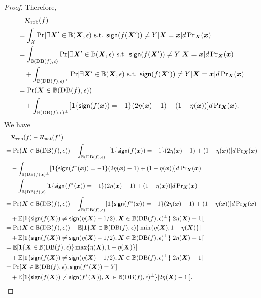 \documentclass[11pt]{article}
\newcommand{\sign}{\textup{\textsf{sign}}}
\newcommand{\adv}{\mathrm{rob}}
\newcommand{\nat}{\mathrm{nat}}
\newcommand{\boundary}{\mathrm{DB}}
\newcommand{\x}{\bm{x}}
\newcommand{\X}{\bm{X}}
\newcommand{\0}{\mathbf{0}}
\newcommand{\1}{\mathbf{1}}
\newcommand{\cR}{\mathcal{R}}
\newcommand{\cX}{\mathcal{X}}
\newcommand{\bbB}{\mathbb{B}}
\newcommand{\bbE}{\mathbb{E}}
\begin{document}
\begin{proof}
Therefore,
\begin{equation*}
\begin{split}
&\quad \cR_\adv(f)\\
&=\int_{\cX} \Pr[\exists \X'\in\bbB(\X,\epsilon) \text{ s.t. }\sign(f(\X'))\not=Y|\X=\x] d \Pr\nolimits_{\X}(\x)\\
&=\int_{\bbB(\boundary(f),\epsilon)} \Pr[\exists \X'\in\bbB(\X,\epsilon) \text{ s.t. }\sign(f(\X'))\not=Y|\X=\x] d \Pr\nolimits_{\X}(\x)\\
&\quad +\int_{\bbB(\boundary(f),\epsilon)^\perp} \Pr[\exists \X'\in\bbB(\X,\epsilon) \text{ s.t. }\sign(f(\X'))\not=Y|\X=\x] d \Pr\nolimits_{\X}(\x)\\
&=\Pr(\X\in \bbB(\boundary(f),\epsilon))\\
&\quad +\int_{\bbB(\boundary(f),\epsilon)^\perp} [\1\{\sign(f(\x))=-1\}(2\eta(\x)-1)+(1-\eta(\x))]d \Pr\nolimits_{\X}(\x).
\end{split}
\end{equation*}
We have
\begin{equation*}
\begin{split}
&\quad\cR_\adv(f)-\cR_\nat(f^*)\\
&=\Pr(\X\in \bbB(\boundary(f),\epsilon))+\int_{\bbB(\boundary(f),\epsilon)^\perp} [\1\{\sign(f(\x))=-1\}(2\eta(\x)-1)+(1-\eta(\x))]d \Pr\nolimits_{\X}(\x)\\
&\quad-\int_{\bbB(\boundary(f),\epsilon)^\perp} [\1\{\sign(f^*(\x))=-1\}(2\eta(\x)-1)+(1-\eta(\x))]d \Pr\nolimits_{\X}(\x)\\
&\quad-\int_{\bbB(\boundary(f),\epsilon)} [\1\{\sign(f^*(\x))=-1\}(2\eta(\x)-1)+(1-\eta(\x))]d \Pr\nolimits_{\X}(\x)\\
&=\Pr(\X\in \bbB(\boundary(f),\epsilon))-\int_{\bbB(\boundary(f),\epsilon)} [\1\{\sign(f^*(\x))=-1\}(2\eta(\x)-1)+(1-\eta(\x))]d \Pr\nolimits_{\X}(\x)\\
&\quad+\bbE[\1\{\sign(f(\X))\not=\sign(\eta(\X)-1/2),\X\in\bbB(\boundary(f),\epsilon)^\perp\}|2\eta(\X)-1|]\\
&=\Pr(\X\in \bbB(\boundary(f),\epsilon))-\bbE[\1\{\X\in \bbB(\boundary(f),\epsilon)\}\min\{\eta(\X),1-\eta(\X)\}]\\
&\quad+\bbE[\1\{\sign(f(\X))\not=\sign(\eta(\X)-1/2),\X\in\bbB(\boundary(f),\epsilon)^\perp\}|2\eta(\X)-1|]\\
&=\bbE[\1\{\X\in \bbB(\boundary(f),\epsilon)\}\max\{\eta(\X),1-\eta(\X)\}]\\
&\quad +\bbE[\1\{\sign(f(\X))\not=\sign(\eta(\X)-1/2),\X\in\bbB(\boundary(f),\epsilon)^\perp\}|2\eta(\X)-1|]\\
&=\Pr[\X\in \bbB(\boundary(f),\epsilon),\sign(f^*(\X))=Y]\\
&\quad +\bbE[\1\{\sign(f(\X))\not=\sign(f^*(\X)),\X\in\bbB(\boundary(f),\epsilon)^\perp\}|2\eta(\X)-1|].
\end{split}
\end{equation*}
\end{proof}
\end{document}
